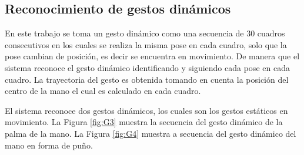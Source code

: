 \subsection{Reconocimiento de gestos dinámicos}\label{RecognitionDynamic}


En este trabajo se toma un gesto dinámico como una secuencia de $30$ cuadros consecutivos en los cuales se realiza la misma pose en cada cuadro, solo que la pose cambian de posición, es decir se encuentra en movimiento. De manera que el sistema reconoce el gesto dinámico identificando y siguiendo cada pose en cada cuadro. La trayectoria del gesto es obtenida tomando en cuenta la posición del centro de la mano el cual es calculado en cada cuadro. 
 
El sistema reconoce dos gestos dinámicos, los cuales son los gestos estáticos en movimiento. La Figura \ref{fig:G3} muestra la secuencia del gesto dinámico de la palma de la mano. La Figura \ref{fig:G4} muestra a secuencia del gesto dinámico del mano en forma de pu\~no.  
